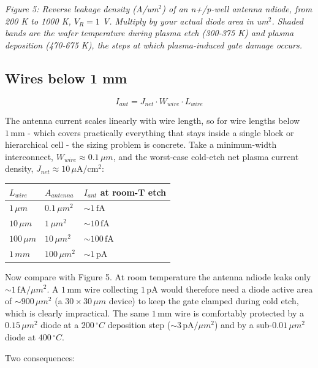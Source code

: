 \emph{Figure 5: Reverse leakage density (A/um\(^2\)) of an n+/p-well
antenna ndiode, from 200 K to 1000 K, \(V_R = 1\) V. Multiply by your
actual diode area in um\(^2\). Shaded bands are the wafer temperature
during plasma etch (300-375 K) and plasma deposition (470-675 K), the
steps at which plasma-induced gate damage occurs.}

\subsection{Wires below 1 mm}\label{wires-below-1-mm}

\[ I_{ant} = J_{net} \cdot W_{wire} \cdot L_{wire} \]

The antenna current scales linearly with wire length, so for wire
lengths below \(1\, \mathrm{mm}\) - which covers practically everything
that stays inside a single block or hierarchical cell - the sizing
problem is concrete. Take a minimum-width interconnect, \(W_{wire}
\approx 0.1\, \mu m\), and the worst-case cold-etch net plasma current
density, \(J_{net} \approx 10\, \mu\mathrm{A/cm^2}\):

\begin{longtable}[]{@{}lll@{}}
\toprule\noalign{}
\(L_{wire}\) & \(A_{antenna}\) & \(I_{ant}\) at room-T etch \\
\midrule\noalign{}
\endhead
\bottomrule\noalign{}
\endlastfoot
\(1\, \mu m\) & \(0.1\, \mu m^2\) & \(\sim 1\, \mathrm{fA}\) \\
\(10\, \mu m\) & \(1\, \mu m^2\) & \(\sim 10\, \mathrm{fA}\) \\
\(100\, \mu m\) & \(10\, \mu m^2\) & \(\sim 100\, \mathrm{fA}\) \\
\(1\, mm\) & \(100\, \mu m^2\) & \(\sim 1\, \mathrm{pA}\) \\
\end{longtable}

Now compare with Figure 5. At room temperature the antenna ndiode leaks
only \(\sim 1\, \mathrm{fA}/\mu m^2\). A \(1\, \mathrm{mm}\) wire
collecting \(1\, \mathrm{pA}\) would therefore need a diode active area
of \(\sim 900\, \mu m^2\) (a \(30 \times 30\, \mu m\) device) to keep
the gate clamped during cold etch, which is clearly impractical. The
same \(1\, \mathrm{mm}\) wire is comfortably protected by a
\(0.15\, \mu m^2\) diode at a \(200\, ^\circ C\) deposition step
(\(\sim 3\, \mathrm{pA}/\mu m^2\)) and by a sub-\(0.01\, \mu m^2\) diode
at \(400\, ^\circ C\).

Two consequences:


